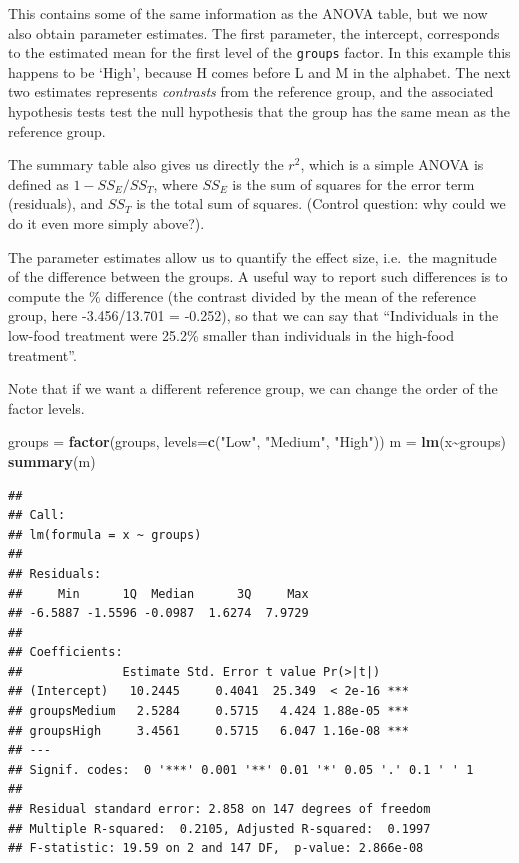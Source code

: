 \documentclass[
]{article}
\newenvironment{Shaded}{\begin{snugshade}}{\end{snugshade}}
\newcommand{\AttributeTok}[1]{\textcolor[rgb]{0.13,0.29,0.53}{#1}}
\newcommand{\FunctionTok}[1]{\textcolor[rgb]{0.13,0.29,0.53}{\textbf{#1}}}
\newcommand{\NormalTok}[1]{#1}
\newcommand{\OtherTok}[1]{\textcolor[rgb]{0.56,0.35,0.01}{#1}}
\newcommand{\SpecialCharTok}[1]{\textcolor[rgb]{0.81,0.36,0.00}{\textbf{#1}}}
\newcommand{\StringTok}[1]{\textcolor[rgb]{0.31,0.60,0.02}{#1}}
\begin{document}
This contains some of the same information as the ANOVA table, but we
now also obtain parameter estimates. The first parameter, the intercept,
corresponds to the estimated mean for the first level of the
\texttt{groups} factor. In this example this happens to be `High',
because H comes before L and M in the alphabet. The next two estimates
represents \emph{contrasts} from the reference group, and the associated
hypothesis tests test the null hypothesis that the group has the same
mean as the reference group.

The summary table also gives us directly the \(r^2\), which is a simple
ANOVA is defined as \(1-SS_E/SS_T\), where \(SS_E\) is the sum of
squares for the error term (residuals), and \(SS_T\) is the total sum of
squares. (Control question: why could we do it even more simply above?).

The parameter estimates allow us to quantify the effect size, i.e.~the
magnitude of the difference between the groups. A useful way to report
such differences is to compute the \% difference (the contrast divided
by the mean of the reference group, here -3.456/13.701 = -0.252), so
that we can say that ``Individuals in the low-food treatment were 25.2\%
smaller than individuals in the high-food treatment''.

Note that if we want a different reference group, we can change the
order of the factor levels.

\begin{Shaded}
\begin{Highlighting}[]
\NormalTok{groups }\OtherTok{=} \FunctionTok{factor}\NormalTok{(groups, }\AttributeTok{levels=}\FunctionTok{c}\NormalTok{(}\StringTok{"Low"}\NormalTok{, }\StringTok{"Medium"}\NormalTok{, }\StringTok{"High"}\NormalTok{))}
\NormalTok{m }\OtherTok{=} \FunctionTok{lm}\NormalTok{(x}\SpecialCharTok{\textasciitilde{}}\NormalTok{groups)}
\FunctionTok{summary}\NormalTok{(m)}
\end{Highlighting}
\end{Shaded}

\begin{verbatim}
## 
## Call:
## lm(formula = x ~ groups)
## 
## Residuals:
##     Min      1Q  Median      3Q     Max 
## -6.5887 -1.5596 -0.0987  1.6274  7.9729 
## 
## Coefficients:
##              Estimate Std. Error t value Pr(>|t|)    
## (Intercept)   10.2445     0.4041  25.349  < 2e-16 ***
## groupsMedium   2.5284     0.5715   4.424 1.88e-05 ***
## groupsHigh     3.4561     0.5715   6.047 1.16e-08 ***
## ---
## Signif. codes:  0 '***' 0.001 '**' 0.01 '*' 0.05 '.' 0.1 ' ' 1
## 
## Residual standard error: 2.858 on 147 degrees of freedom
## Multiple R-squared:  0.2105, Adjusted R-squared:  0.1997 
## F-statistic: 19.59 on 2 and 147 DF,  p-value: 2.866e-08
\end{verbatim}
\end{document}
